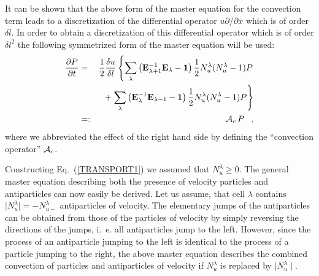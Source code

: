 It can be shown that the above form of the master equation
for the convection term
leads to a discretization of the differential operator
$u\partial /\partial x$ which is of order $\delta l$. In order to
obtain a discretization of this differential operator which is of
order $\delta l^{2}$ the following symmetrized
form of the master equation will be used:
\begin{eqnarray}
\label{TRANSPORT1}
\frac{\partial P}{\partial t} & = & \frac{1}{2}
\frac{\delta u}{\delta l} \left\{
                          \sum_{\lambda}
     \left( {\bf E}_{\lambda +1}^{-1} {\bf E}_{\lambda} - {\bf 1}
    \right) \frac{1}{2} N_u^{\lambda} (N_u^{\lambda}-1) P \right.
               \nonumber \\
& &  + \left.  \sum_{\lambda}
       \left( {\bf E}_{\lambda}^{-1} {\bf E}_{\lambda -1} - {\bf 1}
    \right) \frac{1}{2} N_u^{\lambda} (N_u^{\lambda}-1) P \right\}
               \nonumber \\
&=:&  {\cal{A}}_c \, P          \;\;\; ,
\end{eqnarray}
where we abbreviated the effect of the
right hand side by defining the ``convection operator''
${\cal{A}}_c$.

Constructing Eq.~(\ref{TRANSPORT1}) we assumed that
$N_u^{\lambda} \geq 0$.
The general master equation describing both the presence
of velocity particles
and antiparticles can now easily be derived.
Let us assume, that cell $\lambda$ contains
$\mid N_u^{\lambda}\mid = - N_{u-}^{\lambda}$
antiparticles of velocity. The elementary jumps of the antiparticles
can be obtained from those of the particles of velocity by simply
reversing
the directions of the jumps, i.~e. all antiparticles jump to
the left.
However, since the process of an antiparticle jumping to the left is
identical to the process of a particle jumping to the right, the
above master
equation describes the combined convection of particles and
antiparticles
of velocity if $N_u^{\lambda}$ is replaced by
$\mid N_u^{\lambda} \mid$.

